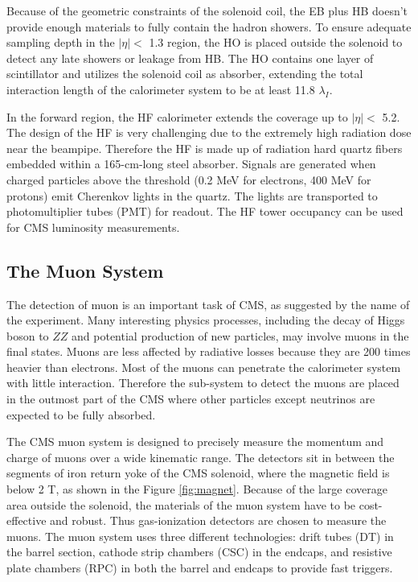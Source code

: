 \documentclass[thesis.tex]{subfiles}
\begin{document}
Because of the geometric constraints of the solenoid coil, the EB plus HB doesn't provide enough materials to fully contain the hadron showers. 
To ensure adequate sampling depth in the $|\eta| < $ 1.3 region, the HO is placed outside the solenoid to detect any late showers or leakage from HB. 
The HO contains one layer of scintillator and utilizes the solenoid coil as absorber, extending the total interaction length of the calorimeter system to be at least 11.8 $\lambda_I$. 

In the forward region, the HF calorimeter extends the coverage up to $|\eta| < $ 5.2.
The design of the HF is very challenging due to the extremely high radiation dose near the beampipe.  
Therefore the HF is made up of radiation hard quartz fibers embedded within a 165-cm-long steel absorber.  
Signals are generated when charged particles above the threshold (0.2 MeV for electrons, 400 MeV for protons) emit Cherenkov lights in the quartz.
The lights are transported to photomultiplier tubes (PMT) for readout. 
The HF tower occupancy can be used for CMS luminosity measurements. 

\subsection{The Muon System}
The detection of muon is an important task of CMS, as suggested by the name of the experiment. 
Many interesting physics processes, including the decay of Higgs boson to $ZZ$ and potential production of new particles, may involve muons in the final states.
Muons are less affected by radiative losses because they are 200 times heavier than electrons.
Most of the muons can penetrate the calorimeter system with little interaction. 
Therefore the sub-system to detect the muons are placed in the outmost part of the CMS where other particles except neutrinos are expected to be fully absorbed.

The CMS muon system is designed to precisely measure the momentum and charge of muons over a wide kinematic range.
The detectors sit in between the segments of iron return yoke of the CMS solenoid, where the magnetic field is below 2 T, as shown in the Figure \ref{fig:magnet}.
Because of the large coverage area outside the solenoid, the materials of the muon system have to be cost-effective and robust.
Thus gas-ionization detectors are chosen to measure the muons. 
The muon system uses three different technologies: drift tubes (DT) in the barrel section, cathode strip chambers (CSC) in the endcaps, and resistive plate chambers (RPC) in both the barrel and endcaps to provide fast triggers.
\end{document}
